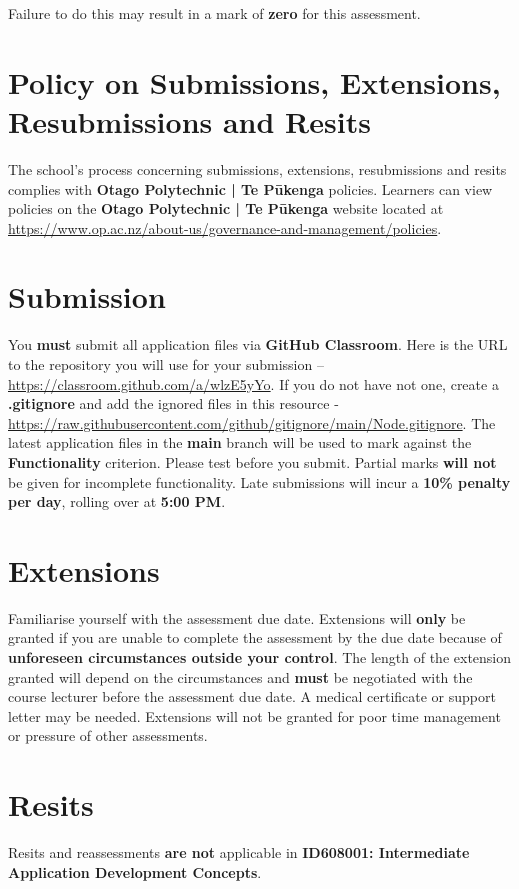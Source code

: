 \documentclass{article}
\begin{document}
 Failure to do this may result in a mark of \textbf{zero} for this assessment.

\section*{Policy on Submissions, Extensions, Resubmissions and Resits}
The school's process concerning submissions, extensions, resubmissions and resits complies with \textbf{Otago Polytechnic | Te Pūkenga} policies. Learners can view policies on the \textbf{Otago Polytechnic | Te Pūkenga} website located at \href{https://www.op.ac.nz/about-us/governance-and-management/policies}{https://www.op.ac.nz/about-us/governance-and-management/policies}.

\section*{Submission}
You \textbf{must} submit all application files via \textbf{GitHub Classroom}. Here is the URL to the repository you will use for your submission – \href{https://classroom.github.com/a/wlzE5yYo}{https://classroom.github.com/a/wlzE5yYo}. If you do not have not one, create a \textbf{.gitignore} and add the ignored files in this resource - \href{https://raw.githubusercontent.com/github/gitignore/main/Node.gitignore}{https://raw.githubusercontent.com/github/gitignore/main/Node.gitignore}. The latest application files in the \textbf{main} branch will be used to mark against the \textbf{Functionality} criterion. Please test before you submit. Partial marks \textbf{will not} be given for incomplete functionality. Late submissions will incur a \textbf{10\% penalty per day}, rolling over at \textbf{5:00 PM}.

\section*{Extensions}
Familiarise yourself with the assessment due date. Extensions will \textbf{only} be granted if you are unable to complete the assessment by the due date because of \textbf{unforeseen circumstances outside your control}. The length of the extension granted will depend on the circumstances and \textbf{must} be negotiated with the course lecturer before the assessment due date. A medical certificate or support letter may be needed. Extensions will not be granted for poor time management or pressure of other assessments.

\section*{Resits}
Resits and reassessments \textbf{are not} applicable in \textbf{ID608001: Intermediate Application Development Concepts}.
\end{document}
